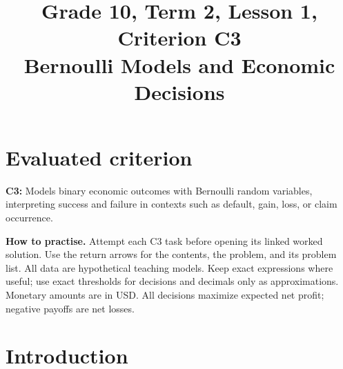 \makeatletter
{}
\makeatother


\GTenHighlightsfalse %
\newcommand{\Indicator}[1]{\GTenHLValue{#1}}
\newcommand{\SuccessProb}[1]{\GTenHLProbability{#1}}
\newcommand{\FailureProb}[1]{\GTenHLParameter{#1}}
\newcommand{\Money}[1]{\GTenHLSecond{#1}}
\usepackage{needspace}
\setlength{\emergencystretch}{2em}
\title{Grade 10, Term 2, Lesson 1, Criterion C3\\Bernoulli Models and Economic Decisions}
\author{}
\date{}

\maketitle
\setcounter{tocdepth}{1}
\setcounter{secnumdepth}{2}
\label{toc}
\tableofcontents
\section*{Evaluated criterion}
\textbf{C3:} Models binary economic outcomes with Bernoulli random variables, interpreting success and failure in contexts such as default, gain, loss, or claim occurrence.

\textbf{How to practise.} Attempt each C3 task before opening its linked worked solution.
Use the return arrows for the contents, the problem, and its problem list.
All data are hypothetical teaching models. Keep exact expressions where useful;
use exact thresholds for decisions and decimals only as approximations. Monetary amounts are in USD.
All decisions maximize expected net profit; negative payoffs are net losses.


\section{Introduction}\label{sec:t2-c3-introduction}
